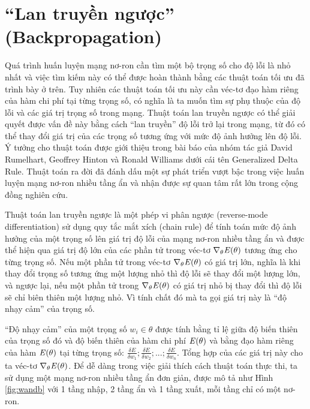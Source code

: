 \section{``Lan truyền ngược'' (Backpropagation)}

Quá trình huấn luyện mạng nơ-ron cần tìm một bộ trọng số cho độ lỗi là nhỏ nhất và việc tìm kiếm này có thể được hoàn thành bằng các thuật toán tối ưu đã trình bày ở trên. Tuy nhiên các thuật toán tối ưu này cần véc-tơ đạo hàm riêng của hàm chi phí tại từng trọng số, có nghĩa là ta muốn tìm sự phụ thuộc của độ lỗi và các giá trị trọng số trong mạng. Thuật toán lan truyền ngược có thể giải quyết được vấn đề này bằng cách ``lan truyền'' độ lỗi trở lại trong mạng, từ đó có thể thay đổi giá trị của các trọng số tương ứng với mức độ ảnh hưởng lên độ lỗi. Ý tưởng cho thuật toán được giới thiệu trong bài báo của nhóm tác giả David Rumelhart, Geoffrey Hinton và Ronald Williams dưới cái tên Generalized Delta Rule\cite{rumelhart1986learning}. Thuật toán ra đời đã đánh dấu một sự phát triển vượt bậc trong việc huấn luyện mạng nơ-ron nhiều tầng ẩn và nhận được sự quan tâm rất lớn trong cộng đồng nghiên cứu.

Thuật toán lan truyền ngược là một phép vi phân ngược (reverse-mode differentiation) sử dụng quy tắc mắt xích (chain rule) để tính toán mức độ ảnh hưởng của một trọng số lên giá trị độ lỗi của mạng nơ-ron nhiều tầng ẩn và được thể hiện qua giá trị độ lớn của các phần tử trong véc-tơ $\nabla_\theta \mathbf{\it{E}(\theta)}$ tương ứng cho từng trọng số. Nếu một phần tử trong véc-tơ $\nabla_\theta \mathbf{\it{E}(\theta)}$ có giá trị lớn, nghĩa là khi thay đổi trọng số tương ứng một lượng nhỏ thì độ lỗi sẽ thay đổi một lượng lớn, và ngược lại, nếu một phần tử trong $\nabla_\theta \mathbf{\it{E}(\theta)}$ có giá trị nhỏ bị thay đổi thì độ lỗi sẽ chỉ biên thiên một lượng nhỏ. Vì tính chất đó mà ta gọi giá trị này là ``độ nhạy cảm'' của trọng số.

``Độ nhạy cảm'' của một trọng số $w_i \in \theta$ được tính bằng tỉ lệ giữa độ biến thiên của trọng số đó và độ biến thiên của hàm chi phí $\mathbf{\it{E}(\theta)}$ và bằng đạo hàm riêng của hàm $\mathbf{\it{E}(\theta)}$ tại từng trọng số: $\frac{\delta E}{\delta w_1}; \frac{\delta E}{\delta w_2};...;\frac{\delta E}{\delta w_n}$. Tổng hợp của các giá trị này cho ta véc-tơ $\nabla_\theta \mathbf{\it{E}(\theta)}$. Để dễ dàng trong việc giải thích cách thuật toán thực thi, ta sử dụng một mạng nơ-ron nhiều tầng ẩn đơn giản, được mô tả như Hình \ref{fig:wandb} với 1 tầng nhập, 2 tầng ẩn và 1 tầng xuất, mỗi tầng chỉ có một nơ-ron.

